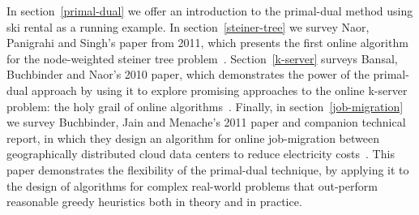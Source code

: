 In section~\ref{primal-dual} we offer an introduction to the primal-dual method using ski rental as a running example.
In section~\ref{steiner-tree} we survey Naor, Panigrahi and Singh's paper from 2011, which presents the first online algorithm for the node-weighted steiner tree problem~\cite{naor11:node-weighted-steiner-tree}.
Section~\ref{k-server} surveys Bansal, Buchbinder and Naor's 2010 paper, which demonstrates the power of the primal-dual approach by using it to explore promising approaches to the online k-server problem: the holy grail of online algorithms~\cite{bansal10:k-server}.
Finally, in section~\ref{job-migration} we survey Buchbinder, Jain and Menache's 2011 paper and companion technical report, in which they design an algorithm for online job-migration between geographically distributed cloud data centers to reduce electricity costs~\cite{buchbinder11:job-migration,buchbinder11:job-migration-techreport}.
This paper demonstrates the flexibility of the primal-dual technique, by applying it to the design of algorithms for complex real-world problems that out-perform reasonable greedy heuristics both in theory and in practice.
